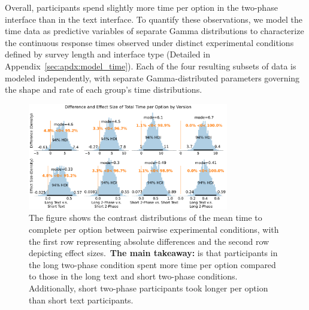 Overall, participants spend slightly more time per option in the two-phase interface than in the text interface. To quantify these observations, we model the time data as predictive variables of separate Gamma distributions to characterize the continuous response times observed under distinct experimental conditions defined by survey length and interface type (Detailed in Appendix~\ref{sec:apdx:model_time}). Each of the four resulting subsets of data is modeled independently, with separate Gamma-distributed parameters governing the shape and rate of each group's time distributions. 

\begin{figure}[h]
    \centering
    \includegraphics[width=0.78\textwidth]{content/image/time/time_diff_per_option_effect_size_by_version}
    \captionsetup{width=0.9\textwidth, justification=justified}
    \caption{The figure shows the contrast distributions of the mean time to complete per option between pairwise experimental conditions, with the first row representing absolute differences and the second row depicting effect sizes.~\textbf{The main takeaway:} is that participants in the long two-phase condition spent more time per option compared to those in the long text and short two-phase conditions. Additionally, short two-phase participants took longer per option than short text participants.}
    \label{fig:time_per_option_bayesian}
\end{figure}

